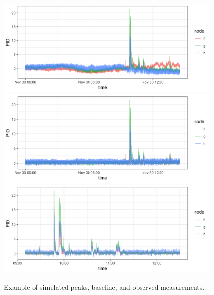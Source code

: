 \documentclass[]{article}
\begin{document}
\begin{figure}
	\caption{Example of simulated peaks, baseline, and observed measurements.}
	\includegraphics[width = \linewidth]{Figures/uncorrected_data.png}
	\includegraphics[width = \linewidth]{Figures/corrected_data.png}
	\includegraphics[width = \linewidth]{Figures/corrected_zoom_data.png}
\end{figure}

\pagebreak




\end{document}
